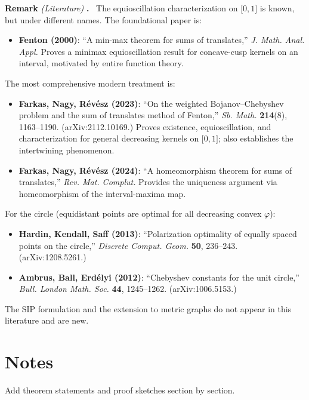 \documentclass[
]{article}
\begin{document}
\textbf{Remark} \emph{(Literature)} \textbf{.}  The equioscillation
characterization on \(\lbrack 0,1\rbrack\) is known, but under different
names. The foundational paper is:

\begin{itemize}
\item
  \textbf{Fenton (2000)}: ``A min-max theorem for sums of translates,''
  \emph{J. Math. Anal. Appl.} Proves a minimax equioscillation result
  for concave-cusp kernels on an interval, motivated by entire function
  theory.
\end{itemize}

The most comprehensive modern treatment is:

\begin{itemize}
\item
  \textbf{Farkas, Nagy, Révész (2023)}: ``On the weighted
  Bojanov--Chebyshev problem and the sum of translates method of
  Fenton,'' \emph{Sb. Math.} \textbf{214}(8), 1163--1190.
  (arXiv:2112.10169.) Proves existence, equioscillation, and
  characterization for general decreasing kernels on
  \(\lbrack 0,1\rbrack\); also establishes the intertwining phenomenon.
\item
  \textbf{Farkas, Nagy, Révész (2024)}: ``A homeomorphism theorem for
  sums of translates,'' \emph{Rev. Mat. Complut.} Provides the
  uniqueness argument via homeomorphism of the interval-maxima map.
\end{itemize}

For the circle (equidistant points are optimal for all decreasing convex
\(\varphi\)):

\begin{itemize}
\item
  \textbf{Hardin, Kendall, Saff (2013)}: ``Polarization optimality of
  equally spaced points on the circle,'' \emph{Discrete Comput. Geom.}
  \textbf{50}, 236--243. (arXiv:1208.5261.)
\item
  \textbf{Ambrus, Ball, Erdélyi (2012)}: ``Chebyshev constants for the
  unit circle,'' \emph{Bull. London Math. Soc.} \textbf{44}, 1245--1262.
  (arXiv:1006.5153.)
\end{itemize}

The SIP formulation and the extension to metric graphs do not appear in
this literature and are new.

\section{Notes}

Add theorem statements and proof sketches section by section.
\end{document}
